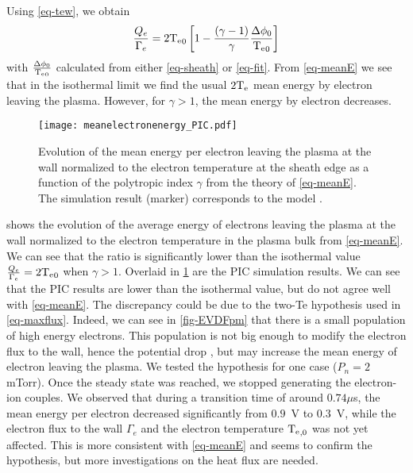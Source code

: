 Using \cref{eq-tew}, we obtain
\begin{equation}
  \label{eq-meanE}
  \frac{Q_e}{\Gamma_e} =  2 \mathrm{T_e}_0 \left[1 - \frac{(\gamma - 1)}{\gamma} \frac{\Delta \phi_0}{\mathrm{T_e}_0} \right]
\end{equation}
with $\frac{\Delta \phi_0}{\mathrm{T_e}_0}$ calculated from either \cref{eq-sheath} or \cref{eq-fit}.
From \cref{eq-meanE} we see that in the isothermal limit we find the usual $2 \mathrm{T_e}$ mean energy by electron leaving the plasma.
However, for $\gamma > 1$, the mean energy by electron decreases.


\begin{figure}[!htbp]
  \centering
  \texttt{[image: meanelectronenergy\_PIC.pdf]}
  \caption{Evolution of the mean energy per electron leaving the plasma at the wall normalized to the electron temperature at the sheath edge as a function of the polytropic index $\gamma$ from the theory of \cref{eq-meanE}. The simulation result (marker) corresponds to the model . }
  \label{fig-avE}
\end{figure}

 shows the evolution of the average energy of electrons leaving the plasma at the wall normalized to the electron temperature in the plasma bulk from \cref{eq-meanE}.
We can see that the ratio is significantly lower than the isothermal value $\frac{Q_e}{\Gamma_e} = 2 \mathrm{T_e}_0$ when $\gamma > 1$.
Overlaid in \cref{fig-avE} are the PIC simulation results.
We can see that the PIC results are lower than the isothermal value, but do not agree well with \cref{eq-meanE}.
The discrepancy could be due to the two-Te hypothesis used in \cref{eq-maxflux}.
Indeed, we can see in \cref{fig-EVDFpm} that there is a small population of high energy electrons.
This population is not big enough to modify the electron flux to the wall, hence the potential drop \citep{demidov2005}, but may increase the mean energy of electron leaving the plasma.
{  We tested the hypothesis for one case ($P_n=2$ mTorr).
Once the steady state was reached, we stopped generating the electron-ion couples.
We observed that during a transition time of around $0.74 \mu$s, the mean energy per electron decreased significantly from $0.9$~V to $0.3$~V, while the electron flux to the wall $\Gamma_e$ and the electron temperature $\mathrm{T_e}_{, 0}$ was not yet affected.
This is more consistent with \cref{eq-meanE} and seems to confirm the hypothesis, but more investigations on the heat flux are needed.
  }

